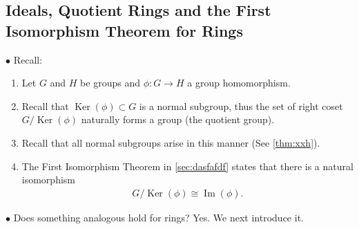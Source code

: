 \documentclass{article}
\newcommand{\Ker}{\operatorname{Ker}}
\begin{document}
\subsection{Ideals, Quotient Rings and the First Isomorphism Theorem for Rings}

$\bullet$ Recall:
\begin{enumerate}
    \item Let $G$ and $H$ be groups and $\phi: G \rightarrow H$ a group homomorphism. 
    \item Recall that $\Ker(\phi) \subset G$ is a normal subgroup, thus the set of right coset $G / \Ker(\phi)$ naturally forms a group (the quotient group). 
    \item Recall that all normal subgroups arise in this manner (See \cref{thm:xxh}). 
    \item The First Isomorphism Theorem in \cref{sec:dasfafdf} states that there is a natural isomorphism
\begin{align*}
G / \Ker(\phi) \cong \operatorname{Im}(\phi) .
\end{align*}
\end{enumerate}

$\bullet$  Does something analogous hold for rings?  Yes. We next introduce it.
\end{document}
